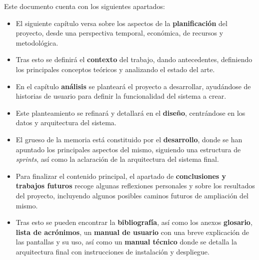 \newpage
Este documento cuenta con los siguientes apartados:
\begin{itemize}
	\item El siguiente capítulo versa sobre los aspectos de la \textbf{planificación} del proyecto, desde una perspectiva temporal, económica, de recursos y metodológica.
	\item Tras esto se definirá el \textbf{contexto} del trabajo, dando antecedentes, definiendo los principales conceptos teóricos y analizando el estado del arte.
	\item En el capítulo \textbf{análisis} se planteará el proyecto a desarrollar, ayudándose de historias de usuario para definir la funcionalidad del sistema a crear.
	\item Este planteamiento se refinará y detallará en el \textbf{diseño}, centrándose en los datos y arquitectura del sistema.
	\item El grueso de la memoria está constituido por el \textbf{desarrollo}, donde se han apuntado los principales aspectos del mismo, siguiendo una estructura de \textit{sprints}, así como la aclaración de la arquitectura del sistema final.
	\item Para finalizar el contenido principal, el apartado de \textbf{conclusiones y trabajos futuros} recoge algunas reflexiones personales y sobre los resultados del proyecto, incluyendo algunos posibles caminos futuros de ampliación del mismo.
	\item Tras esto se pueden encontrar la \textbf{bibliografía}, así como los anexos \textbf{glosario}, \textbf{lista de acrónimos}, un \textbf{manual de usuario} con una breve explicación de las pantallas y su uso, así como un \textbf{manual técnico} donde se detalla la arquitectura final con instrucciones de instalación y despliegue.
\end{itemize}


